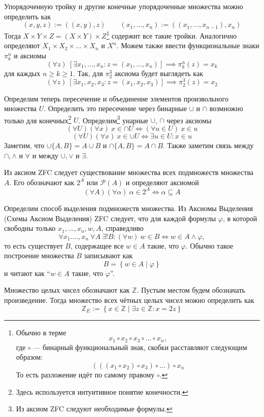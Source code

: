 Упорядоченную тройку и другие конечные упорядоченные множества
можно определить как
\[
  (x,y,z):=((x,y),z)\qquad (x_1,...,x_{n}):=((x_1,...,x_{n-1}),x_{n})
\]
Тогда $X\times Y\times Z=(X\times Y)\times Z$\footnote{
  Обычно в терме
  \[
    x_1\circ x_2\circ x_3\circ...\circ x_{n},
  \]
  где $\circ$ --- бинарный функциональный знак,
  скобки расставляют следующим образом:
  \[
    (((x_1\circ x_2)\circ x_3)\circ...)\circ x_{n}
  \]
  То есть разложение идёт по самому правому $\circ$.
} содержит все такие тройки.
Аналогично определяют $X_1\times X_2\times ...\times X_{n}$ и $X^{n}$.
Можем также ввести функциональные знаки $\pi_{k}^{n}$ и аксиомы
\[
  (\forall z)~[\exists x_1,...,x_{n}:z=(x_1,...,x_{n})]\implies \pi_{k}^{n}(z)=x_{k}
\]
для каждых $n\geq k\geq 1$. Так, для $\pi_{2}^{3}$ аксиома
будет выглядеть как
\[
  (\forall z)~[\exists x_1,x_2,x_3:z=(x_1,x_2,x_3)]\implies \pi_2^{3}(z)=x_2
\]

Определим теперь пересечение и объединение элементов произвольного множества $U$.
Определить это пересечение через бинарные $\cup$ и $\cap$
возмножно только для конечных\footnote{Здесь используется
  интуитивное понятие конечности.} $U$.
Определим\footnote{Из аксиом ZFC следуют необходимые формулы.} унарные $\cup$, $\cap$
через аксиомы
\[
  (\forall U)(\forall x)~x\in\cap U\iff (\forall u\in U)~x\in u
\]
\[
  (\forall U)(\forall x)~x\in\cup U\iff \exists u\in U:x\in u
\]
Заметим, что $\cup \{A,B\}=A\cup B$ и $\cap \{A,B\}=A\cap B$.
Также заметим связь между $\cap,\land$ и $\forall$ и между $\cup,\lor$ и $\exists$.

Из аксиом ZFC следует существование множества всех подмножеств множества $A$.
Его обозначают как $2^{A}$ или $\mathcal P(A)$ и определяют аксиомой
\[
  (\forall A)(\forall \alpha)~\alpha\in 2^{A}\iff \alpha\subseteq A
\]

Определим способ выделения подмножеств множества.
Из Аксиомы Выделения (Схемы Аксиом Выделения)
ZFC следует, что для каждой формулы $\varphi$, в которой свободны
только $x_1,...,x_{n},w,A$, справедливо
\[
  \forall x_1...., x_{n}~\forall A~\exists !B:
  (\forall w)~w\in B\iff w\in A\land \varphi,
\]
то есть существует $B$, содержащее все $w\in A$ такие, что $\varphi$.
Обычно такое построение множества $B$ записывают как
\[
  B=\left\{w\in A\;\big|\;\varphi\right\}
\]
и читают как ``$w\in A$ такие, что $\varphi$''.

\newcommand\Z{\mathbb Z}
Множество целых чисел обозначают как $\Z$\index{множество!целых чисел, $\Z$}.
Пустым местом будем обозначать произведение. Тогда
множество всех чётных целых чисел можно определить как
\[
  \Z_{E}:=\left\{x\in\Z\;\big|\;\exists z\in\Z:x=2z\right\}
\]

